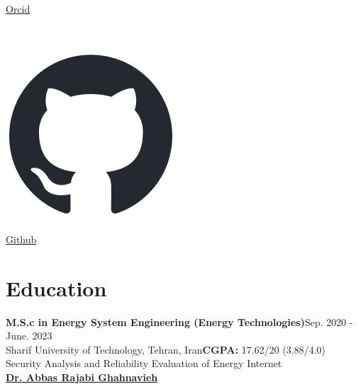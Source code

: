 \documentclass[letter,20pt]{article}
\begin{document}
\begin{minipage}[t]{0.45\textwidth}
  \parbox{3cm}{\href{https://orcid.org/0000-0003-2370-111X}{Orcid}}\\
  \parbox{0.5cm}{\includegraphics[scale=0.24]{github-mark}}
  \parbox{3cm}{\href{https://github.com/Mortezano1}{Github}}
\end{minipage}
\section{Education}
\vspace{5pt}

{\fontsize{10}{12}\selectfont %
\textbf{M.S.c in Energy System Engineering (Energy Technologies)}\hfill {\footnotesize Sep. 2020 - June. 2023}\\\vspace{5pt}
\hspace{10pt}Sharif University of Technology, Tehran, Iran\hfill \hspace{10pt}\footnotesize \textbf{CGPA:} 17.62/20 (3.88/4.0)\vspace{3pt}\\
\hspace{10pt} Security Analysis and Reliability Evaluation of Energy Internet\\
\hspace{10pt} \hyperref[ref:prof1]{\textbf{Dr. Abbas Rajabi Ghahnavieh}}\\
} 
\vspace{10pt}
\end{document}
